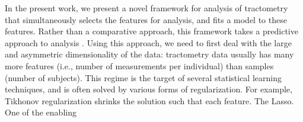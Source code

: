 In the present work, we present a novel framework for analysis of tractometry
that simultaneously selects the features for analysis, and fits a model to these
features. Rather than a comparative approach, this framework takes a predictive
approach to analysis \cite{Yarkoni2017-bi}. Using this approach, we need to
first deal with the large and asymmetric dimensionality of the data: tractometry
data usually has many more features (i.e., number of measurements per
individual) than samples (number of subjects). This regime is the target of
several statistical learning techniques, and is often solved by various forms of
regularization. For example, Tikhonov regularization shrinks the solution such that
each feature. The Lasso. One of the enabling

